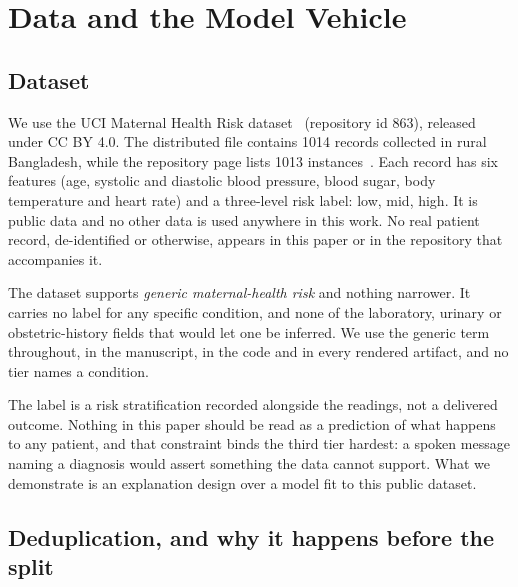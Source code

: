 \section{Data and the Model Vehicle}
\label{sec:data}

\subsection{Dataset}
\label{sec:data-dataset}

We use the UCI Maternal Health Risk dataset~\citep{ahmed2020maternal}
(repository id 863), released under CC BY 4.0. The distributed file contains
1014 records collected in rural Bangladesh, while the repository page lists
1013 instances~\citep{ahmed2020maternal}.
Each record has six features (age, systolic and
diastolic blood pressure, blood sugar, body temperature and heart rate) and a
three-level risk label: low, mid, high. It is public data and no other data
is used anywhere in this work. No real patient record, de-identified or otherwise, appears in this
paper or in the repository that accompanies it.

The dataset supports \emph{generic maternal-health risk} and nothing
narrower. It carries no label for any specific condition, and none of the
laboratory, urinary or obstetric-history fields that would let one be
inferred. We use the generic term throughout, in the manuscript, in the code
and in every rendered artifact, and no tier names a condition.

The label is a risk stratification recorded alongside the readings, not a
delivered outcome. Nothing in this paper should be read as a prediction of
what happens to any patient, and that constraint binds the third tier
hardest: a spoken message naming a diagnosis would assert something the data
cannot support. What we demonstrate is an explanation design over a model
fit to this public dataset.

\subsection{Deduplication, and why it happens before the split}
\label{sec:data-dedup}

